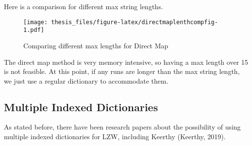 \documentclass[12pt,twoside]{reedthesis}
\begin{document}
Here is a comparison for different max string lengths.
\begin{figure}
\centering
\texttt{[image: thesis\_files/figure-latex/directmaplenthcompfig-1.pdf]}
\caption{\label{fig:directmaplenthcompfig}Comparing different max lengths for Direct Map}
\end{figure}
The direct map method is very memory intensive, so having a max length over 15 is not feasible. At this point, if any runs are longer than the max string length, we just use a regular dictionary to accommodate them.

\hypertarget{multiple-indexed-dictionaries}{%
\subsection{Multiple Indexed Dictionaries}\label{multiple-indexed-dictionaries}}

As stated before, there have been research papers about the possibility of using multiple indexed dictionaries for LZW, including Keerthy (Keerthy, 2019).
\end{document}

